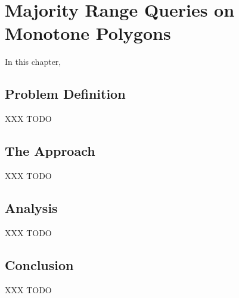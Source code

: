 \chapter{Majority Range Queries on Monotone Polygons}
\label{:monotonep}


In this chapter, 


\section{Problem Definition}
\label{:monotonep:problem-definition}

XXX TODO

\section{The Approach}
\label{:monotonep:approach}


XXX TODO

\section{Analysis}
\label{:monotonep:analysis}

XXX TODO

\section{Conclusion}
\label{:monotonep:concl}

XXX TODO
